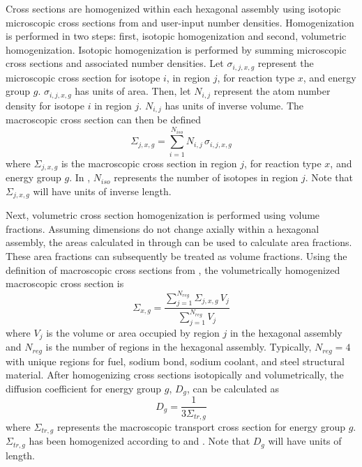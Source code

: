   Cross sections are homogenized within each hexagonal assembly using isotopic
  microscopic cross sections from \mcc and user-input number densities.
  Homogenization is performed in two steps: first, isotopic homogenization and
  second, volumetric homogenization. Isotopic homogenization is performed by
  summing microscopic cross sections and associated number densities. Let
  $\sigma_{i,j,x,g}$ represent the microscopic cross section for isotope $i$, in
  region $j$, for reaction type $x$, and energy group $g$.  $\sigma_{i,j,x,g}$
  has units of area. Then, let $N_{i,j}$ represent the atom number density for
  isotope $i$ in region $j$. $N_{i,j}$ has units of inverse volume.  The
  macroscopic cross section can then be defined
  \begin{equation}
    \label{eq:isotopic_homogenization}
    \Sigma_{j,x,g} = \sum_{i=1}^{N_{iso}} N_{i,j} \, \sigma_{i,j,x,g}
  \end{equation}
  where $\Sigma_{j,x,g}$ is the macroscopic cross section in region $j$, for
  reaction type $x$, and energy group $g$. In ,
  $N_{iso}$ represents the number of isotopes in region $j$. Note that
  $\Sigma_{j,x,g}$ will have units of inverse length.

  Next, volumetric cross section homogenization is performed using volume
  fractions. Assuming dimensions do not change axially within a hexagonal
  assembly, the areas calculated in  through
   can be used to calculate area fractions.
  These area fractions can subsequently be treated as volume fractions.
  Using the definition of macroscopic cross sections from
  , the volumetrically homogenized macroscopic
  cross section is 
  \begin{equation}
    \label{eq:volumetric_homogenization}
    \Sigma_{x,g} = \frac{\sum_{j = 1}^{N_{reg}} \Sigma_{j,x,g} \, V_j}
      {\sum_{j=1}^{N_{reg}} V_j}
  \end{equation}
  where $V_j$ is the volume or area occupied by region $j$ in the hexagonal
  assembly and $N_{reg}$ is the number of regions in the hexagonal assembly.
  Typically, $N_{reg} = 4$ with unique regions for fuel, sodium bond, sodium
  coolant, and steel structural material. After homogenizing cross sections
  isotopically and volumetrically, the diffusion coefficient for energy group
  $g$, $D_g$, can be calculated as 
  \begin{equation}
    \label{eq:diffusion_homogenization}
    D_g = \frac{1}{3 \Sigma_{tr,g}}
  \end{equation}
  where $\Sigma_{tr,g}$ represents the macroscopic transport cross section for
  energy group $g$. $\Sigma_{tr,g}$ has been homogenized according to
   and .
  Note that $D_g$ will have units of length.

